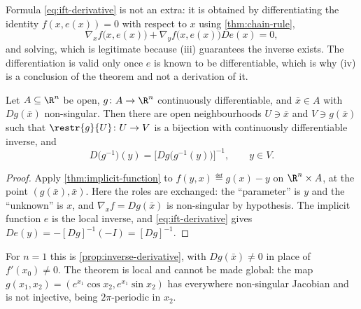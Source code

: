 Formula \eqref{eq:ift-derivative} is not an extra: it is obtained by
differentiating the identity $f(x,e(x))=0$ with respect to $x$ using
\autoref{thm:chain-rule},
\[
	\nabla_xf\bigl(x,e(x)\bigr)+\nabla_yf\bigl(x,e(x)\bigr)De(x)=0,
\]
and solving, which is legitimate because (iii) guarantees the inverse
exists. The differentiation is valid only once $e$ is known to be
differentiable, which is why (iv) is a conclusion of the theorem and not a
derivation of it.

\begin{corollary}\label{thm:inverse-function}
	Let $A\subseteq\R^n$ be open, $g\colon A\to\R^n$ continuously differentiable,
	and $\bar x\in A$ with $Dg(\bar x)$ non-singular. Then there are open
	neighbourhoods $U\ni\bar x$ and $V\ni g(\bar x)$ such that
	$\restr{g}{U}\colon U\to V$ is a bijection with continuously differentiable
	inverse, and
	\[
		D\bigl(g^{-1}\bigr)(y)=\bigl[Dg\bigl(g^{-1}(y)\bigr)\bigr]^{-1},
		\qquad y\in V .
	\]
\end{corollary}

\begin{proof}
	Apply \autoref{thm:implicit-function} to $f(y,x)\eqdef g(x)-y$ on
	$\R^n\times A$, at the point $(g(\bar x),\bar x)$. Here the roles are exchanged:
	the ``parameter'' is $y$ and the ``unknown'' is $x$, and
	$\nabla_xf=Dg(\bar x)$ is non-singular by hypothesis. The implicit function
	$e$ is the local inverse, and \eqref{eq:ift-derivative} gives
	$De(y)=-[Dg]^{-1}(-I)=[Dg]^{-1}$.
\end{proof}

For $n=1$ this is \autoref{prop:inverse-derivative}, with $Dg(\bar x)\neq0$ in
place of $f'(x_0)\neq0$. The theorem is local and cannot be made global: the map
$g(x_1,x_2)=(e^{x_1}\cos x_2,e^{x_1}\sin x_2)$ has everywhere non-singular
Jacobian and is not injective, being $2\pi$-periodic in $x_2$.

